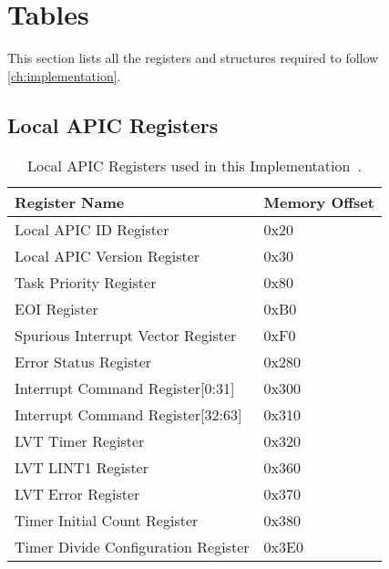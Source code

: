 \chapter{Tables}
\label{ch:tables}

This section lists all the registers and structures required to follow \autoref{ch:implementation}.

\clearpage

\renewcommand{\arraystretch}{1.2}

\section{Local APIC Registers}
\label{sec:localapicregisters}

\begin{table}[H]
  \centering
  \begin{tabularx}{1.0\textwidth}{| X | X |}
    \hline
    \textbf{Register Name}              & \textbf{Memory Offset} \\ \hline\hline
    Local APIC ID Register              & 0x20                   \\ \hline
    Local APIC Version Register         & 0x30                   \\ \hline
    Task Priority Register              & 0x80                   \\ \hline
    EOI Register                        & 0xB0                   \\ \hline
    Spurious Interrupt Vector Register  & 0xF0                   \\ \hline
    Error Status Register               & 0x280                  \\ \hline
    Interrupt Command Register[0:31]    & 0x300                  \\ \hline
    Interrupt Command Register[32:63]   & 0x310                  \\ \hline
    LVT Timer Register                  & 0x320                  \\ \hline
    LVT LINT1 Register                  & 0x360                  \\ \hline
    LVT Error Register                  & 0x370                  \\ \hline
    Timer Initial Count Register        & 0x380                  \\ \hline
    Timer Divide Configuration Register & 0x3E0                  \\ \hline
  \end{tabularx}
  \caption{Local APIC Registers used in this Implementation~\cite[sec.~3.11.4.1]{ia32}.}
  \label{tab:lapicregs}
\end{table}

